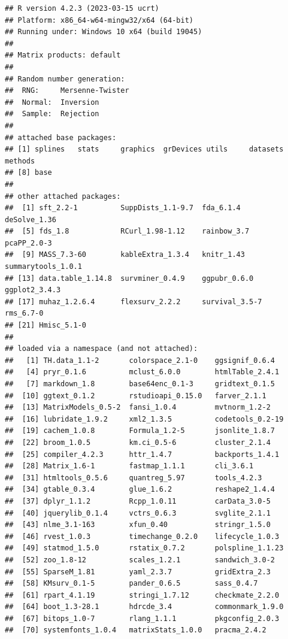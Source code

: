 \documentclass[
]{article}
\begin{document}
\begin{verbatim}
## R version 4.2.3 (2023-03-15 ucrt)
## Platform: x86_64-w64-mingw32/x64 (64-bit)
## Running under: Windows 10 x64 (build 19045)
## 
## Matrix products: default
## 
## Random number generation:
##  RNG:     Mersenne-Twister 
##  Normal:  Inversion 
##  Sample:  Rejection 
##  
## attached base packages:
## [1] splines   stats     graphics  grDevices utils     datasets  methods  
## [8] base     
## 
## other attached packages:
##  [1] sft_2.2-1          SuppDists_1.1-9.7  fda_6.1.4          deSolve_1.36      
##  [5] fds_1.8            RCurl_1.98-1.12    rainbow_3.7        pcaPP_2.0-3       
##  [9] MASS_7.3-60        kableExtra_1.3.4   knitr_1.43         summarytools_1.0.1
## [13] data.table_1.14.8  survminer_0.4.9    ggpubr_0.6.0       ggplot2_3.4.3     
## [17] muhaz_1.2.6.4      flexsurv_2.2.2     survival_3.5-7     rms_6.7-0         
## [21] Hmisc_5.1-0       
## 
## loaded via a namespace (and not attached):
##   [1] TH.data_1.1-2       colorspace_2.1-0    ggsignif_0.6.4     
##   [4] pryr_0.1.6          mclust_6.0.0        htmlTable_2.4.1    
##   [7] markdown_1.8        base64enc_0.1-3     gridtext_0.1.5     
##  [10] ggtext_0.1.2        rstudioapi_0.15.0   farver_2.1.1       
##  [13] MatrixModels_0.5-2  fansi_1.0.4         mvtnorm_1.2-2      
##  [16] lubridate_1.9.2     xml2_1.3.5          codetools_0.2-19   
##  [19] cachem_1.0.8        Formula_1.2-5       jsonlite_1.8.7     
##  [22] broom_1.0.5         km.ci_0.5-6         cluster_2.1.4      
##  [25] compiler_4.2.3      httr_1.4.7          backports_1.4.1    
##  [28] Matrix_1.6-1        fastmap_1.1.1       cli_3.6.1          
##  [31] htmltools_0.5.6     quantreg_5.97       tools_4.2.3        
##  [34] gtable_0.3.4        glue_1.6.2          reshape2_1.4.4     
##  [37] dplyr_1.1.2         Rcpp_1.0.11         carData_3.0-5      
##  [40] jquerylib_0.1.4     vctrs_0.6.3         svglite_2.1.1      
##  [43] nlme_3.1-163        xfun_0.40           stringr_1.5.0      
##  [46] rvest_1.0.3         timechange_0.2.0    lifecycle_1.0.3    
##  [49] statmod_1.5.0       rstatix_0.7.2       polspline_1.1.23   
##  [52] zoo_1.8-12          scales_1.2.1        sandwich_3.0-2     
##  [55] SparseM_1.81        yaml_2.3.7          gridExtra_2.3      
##  [58] KMsurv_0.1-5        pander_0.6.5        sass_0.4.7         
##  [61] rpart_4.1.19        stringi_1.7.12      checkmate_2.2.0    
##  [64] boot_1.3-28.1       hdrcde_3.4          commonmark_1.9.0   
##  [67] bitops_1.0-7        rlang_1.1.1         pkgconfig_2.0.3    
##  [70] systemfonts_1.0.4   matrixStats_1.0.0   pracma_2.4.2       

\end{verbatim}
\end{document}
